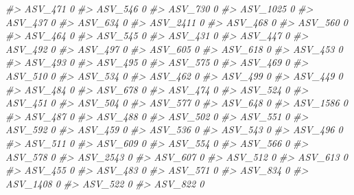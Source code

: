 \documentclass[
]{article}
\newenvironment{Shaded}{\begin{snugshade}}{\end{snugshade}}
\newcommand{\CommentTok}[1]{\textcolor[rgb]{0.56,0.35,0.01}{\textit{#1}}}
\begin{document}
\begin{Shaded}
\begin{Highlighting}[]
\CommentTok{\#\textgreater{} ASV\_471   0}
\CommentTok{\#\textgreater{} ASV\_546   0}
\CommentTok{\#\textgreater{} ASV\_730   0}
\CommentTok{\#\textgreater{} ASV\_1025  0}
\CommentTok{\#\textgreater{} ASV\_437   0}
\CommentTok{\#\textgreater{} ASV\_634   0}
\CommentTok{\#\textgreater{} ASV\_2411  0}
\CommentTok{\#\textgreater{} ASV\_468   0}
\CommentTok{\#\textgreater{} ASV\_560   0}
\CommentTok{\#\textgreater{} ASV\_464   0}
\CommentTok{\#\textgreater{} ASV\_545   0}
\CommentTok{\#\textgreater{} ASV\_431   0}
\CommentTok{\#\textgreater{} ASV\_447   0}
\CommentTok{\#\textgreater{} ASV\_492   0}
\CommentTok{\#\textgreater{} ASV\_497   0}
\CommentTok{\#\textgreater{} ASV\_605   0}
\CommentTok{\#\textgreater{} ASV\_618   0}
\CommentTok{\#\textgreater{} ASV\_453   0}
\CommentTok{\#\textgreater{} ASV\_493   0}
\CommentTok{\#\textgreater{} ASV\_495   0}
\CommentTok{\#\textgreater{} ASV\_575   0}
\CommentTok{\#\textgreater{} ASV\_469   0}
\CommentTok{\#\textgreater{} ASV\_510   0}
\CommentTok{\#\textgreater{} ASV\_534   0}
\CommentTok{\#\textgreater{} ASV\_462   0}
\CommentTok{\#\textgreater{} ASV\_499   0}
\CommentTok{\#\textgreater{} ASV\_449   0}
\CommentTok{\#\textgreater{} ASV\_484   0}
\CommentTok{\#\textgreater{} ASV\_678   0}
\CommentTok{\#\textgreater{} ASV\_474   0}
\CommentTok{\#\textgreater{} ASV\_524   0}
\CommentTok{\#\textgreater{} ASV\_451   0}
\CommentTok{\#\textgreater{} ASV\_504   0}
\CommentTok{\#\textgreater{} ASV\_577   0}
\CommentTok{\#\textgreater{} ASV\_648   0}
\CommentTok{\#\textgreater{} ASV\_1586  0}
\CommentTok{\#\textgreater{} ASV\_487   0}
\CommentTok{\#\textgreater{} ASV\_488   0}
\CommentTok{\#\textgreater{} ASV\_502   0}
\CommentTok{\#\textgreater{} ASV\_551   0}
\CommentTok{\#\textgreater{} ASV\_592   0}
\CommentTok{\#\textgreater{} ASV\_459   0}
\CommentTok{\#\textgreater{} ASV\_536   0}
\CommentTok{\#\textgreater{} ASV\_543   0}
\CommentTok{\#\textgreater{} ASV\_496   0}
\CommentTok{\#\textgreater{} ASV\_511   0}
\CommentTok{\#\textgreater{} ASV\_609   0}
\CommentTok{\#\textgreater{} ASV\_554   0}
\CommentTok{\#\textgreater{} ASV\_566   0}
\CommentTok{\#\textgreater{} ASV\_578   0}
\CommentTok{\#\textgreater{} ASV\_2543  0}
\CommentTok{\#\textgreater{} ASV\_607   0}
\CommentTok{\#\textgreater{} ASV\_512   0}
\CommentTok{\#\textgreater{} ASV\_613   0}
\CommentTok{\#\textgreater{} ASV\_455   0}
\CommentTok{\#\textgreater{} ASV\_483   0}
\CommentTok{\#\textgreater{} ASV\_571   0}
\CommentTok{\#\textgreater{} ASV\_834   0}
\CommentTok{\#\textgreater{} ASV\_1408  0}
\CommentTok{\#\textgreater{} ASV\_522   0}
\CommentTok{\#\textgreater{} ASV\_822   0}

\end{Highlighting}
\end{Shaded}
\end{document}

